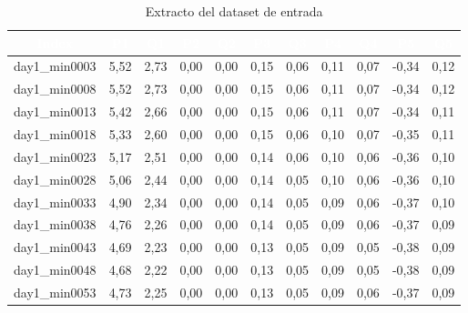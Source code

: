 \begin{table}[htp]
	\centering
	\renewcommand{\arraystretch}{1.3}
	\begin{tabular}{ | c | c | c | c | c | c | c | c | c | c | c | }
		\hline
		\rowcolor[HTML]{5B9BD5} 
		\textcolor{white}{\textbf{Index}} & \textcolor{white}{\textbf{P1}} & \textcolor{white}{\textbf{Q1}} & \textcolor{white}{\textbf{P2}} & \textcolor{white}{\textbf{Q2}} 
		& \textcolor{white}{\textbf{P3}} & \textcolor{white}{\textbf{Q3}} & \textcolor{white}{\textbf{P4}} & \textcolor{white}{\textbf{Q4}} & \textcolor{white}{\textbf{P5}} & \textcolor{white}{\textbf{Q5}} \\
		\hline
		
		day1\_min0003 & 5,52 & 2,73 & 0,00 & 0,00 & 0,15 & 0,06 & 0,11 & 0,07 & -0,34 & 0,12 \\
		\hline
		day1\_min0008 & 5,52 & 2,73 & 0,00 & 0,00 & 0,15 & 0,06 & 0,11 & 0,07 & -0,34 & 0,12 \\
		\hline
		day1\_min0013 & 5,42 & 2,66 & 0,00 & 0,00 & 0,15 & 0,06 & 0,11 & 0,07 & -0,34 & 0,11 \\
		\hline
		day1\_min0018 & 5,33 & 2,60 & 0,00 & 0,00 & 0,15 & 0,06 & 0,10 & 0,07 & -0,35 & 0,11 \\
		\hline
		day1\_min0023 & 5,17 & 2,51 & 0,00 & 0,00 & 0,14 & 0,06 & 0,10 & 0,06 & -0,36 & 0,10 \\
		\hline
		day1\_min0028 & 5,06 & 2,44 & 0,00 & 0,00 & 0,14 & 0,05 & 0,10 & 0,06 & -0,36 & 0,10 \\
		\hline
		day1\_min0033 & 4,90 & 2,34 & 0,00 & 0,00 & 0,14 & 0,05 & 0,09 & 0,06 & -0,37 & 0,10 \\
		\hline
		day1\_min0038 & 4,76 & 2,26 & 0,00 & 0,00 & 0,14 & 0,05 & 0,09 & 0,06 & -0,37 & 0,09 \\
		\hline
		day1\_min0043 & 4,69 & 2,23 & 0,00 & 0,00 & 0,13 & 0,05 & 0,09 & 0,05 & -0,38 & 0,09 \\
		\hline
		day1\_min0048 & 4,68 & 2,22 & 0,00 & 0,00 & 0,13 & 0,05 & 0,09 & 0,05 & -0,38 & 0,09 \\
		\hline
		day1\_min0053 & 4,73 & 2,25 & 0,00 & 0,00 & 0,13 & 0,05 & 0,09 & 0,06 & -0,37 & 0,09 \\
		\hline
		
	\end{tabular}
	
	\caption{Extracto del dataset de entrada}
	\label{table:dataset-1}
\end{table}